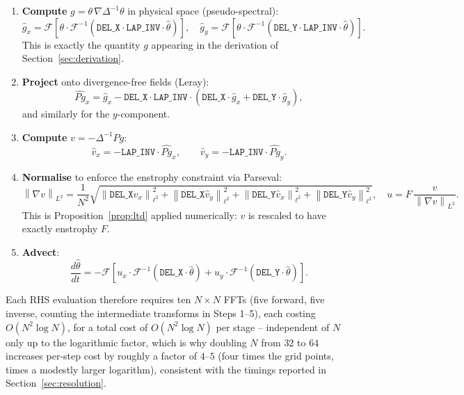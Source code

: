 \documentclass[12pt,a4paper]{article}
\newcommand{\norm}[1]{\left\lVert#1\right\rVert}
\newcommand{\lapinv}{\Delta^{-1}}
\newcommand{\Proj}{P}
\theoremstyle{definition}
\theoremstyle{plain}
\begin{document}
\begin{enumerate}
  \item \textbf{Compute} $g = \theta\,\nabla\lapinv\theta$ in physical space
        (pseudo-spectral):
        \[
          \hat g_x = \mathcal{F}\!\left[\theta\cdot\mathcal{F}^{-1}
            (\texttt{DEL\_X}\cdot\texttt{LAP\_INV}\cdot\hat\theta)\right],
          \quad
          \hat g_y = \mathcal{F}\!\left[\theta\cdot\mathcal{F}^{-1}
            (\texttt{DEL\_Y}\cdot\texttt{LAP\_INV}\cdot\hat\theta)\right].
        \]
        This is exactly the quantity $g$ appearing in the derivation of
        Section~\ref{sec:derivation}.

  \item \textbf{Project} onto divergence-free fields (Leray):
        \[
          \widehat{\Proj g}_x = \hat g_x
            - \texttt{DEL\_X}\cdot\texttt{LAP\_INV}
              \cdot(\texttt{DEL\_X}\cdot\hat g_x+\texttt{DEL\_Y}\cdot\hat g_y),
        \]
        and similarly for the $y$-component.

  \item \textbf{Compute} $v = -\lapinv\Proj g$:
        \[
          \hat v_x = -\texttt{LAP\_INV}\cdot\widehat{\Proj g}_x,\qquad
          \hat v_y = -\texttt{LAP\_INV}\cdot\widehat{\Proj g}_y.
        \]

  \item \textbf{Normalise} to enforce the enstrophy constraint via Parseval:
        \[
          \norm{\nabla v}_{L^2}
          = \frac{1}{N^2}\sqrt{
              \norm{\texttt{DEL\_X}\hat v_x}_{\ell^2}^2
              +\norm{\texttt{DEL\_X}\hat v_y}_{\ell^2}^2
              +\norm{\texttt{DEL\_Y}\hat v_x}_{\ell^2}^2
              +\norm{\texttt{DEL\_Y}\hat v_y}_{\ell^2}^2},
          \quad
          u = F\,\frac{v}{\norm{\nabla v}_{L^2}}.
        \]
        This is Proposition~\ref{prop:ltd} applied numerically: $v$ is
        rescaled to have exactly enstrophy $F$.

  \item \textbf{Advect}:
        \[
          \frac{d\hat\theta}{dt}
          = -\mathcal{F}\!\left[
              u_x\cdot\mathcal{F}^{-1}(\texttt{DEL\_X}\cdot\hat\theta)
              + u_y\cdot\mathcal{F}^{-1}(\texttt{DEL\_Y}\cdot\hat\theta)
            \right].
        \]
\end{enumerate}

Each RHS evaluation therefore requires ten $N\times N$ FFTs (five forward,
five inverse, counting the intermediate transforms in Steps 1--5), each
costing $O(N^2\log N)$, for a total cost of $O(N^2\log N)$ per stage --
independent of $N$ only up to the logarithmic factor, which is why doubling
$N$ from $32$ to $64$ increases per-step cost by roughly a factor of
$4$--$5$ (four times the grid points, times a modestly larger logarithm),
consistent with the timings reported in Section~\ref{sec:resolution}.
\end{document}
